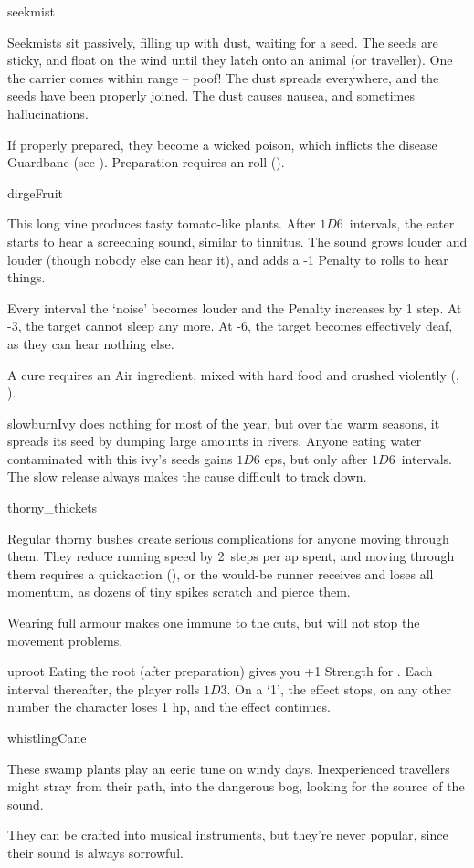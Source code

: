 \begin{multicols}{2}
%
  {seekmist}%
  {Seekmists sit passively, filling up with dust, waiting for a seed.
  The seeds are sticky, and float on the wind until they latch onto an animal (or traveller).
  One the carrier comes within range -- poof!
  The dust spreads everywhere, and the seeds have been properly joined.
  The dust causes nausea, and sometimes hallucinations.

  If properly prepared, they become a wicked poison, which inflicts the disease Guardbane (see ).
  Preparation requires an  roll (\tn[12]).
    }


%
  {dirgeFruit}%
  {This long vine produces tasty tomato-like plants.
    After $1D6$~\glspl{interval}, the eater starts to hear a screeching sound, similar to tinnitus.
    The sound grows louder and louder (though nobody else can hear it), and adds a -1 Penalty to rolls to hear things.

    Every \gls{interval} the `noise' becomes louder and the Penalty increases by 1 step.
    At -3, the target cannot sleep any more.
    At -6, the target becomes effectively deaf, as they can hear nothing else.

    A cure requires an Air \gls{ingredient}, mixed with hard food and crushed violently (, \tn[10]).}%

%
  {slowburnIvy}%
  {does nothing for most of the year, but over the warm seasons, it spreads its seed by dumping large amounts in rivers.
  Anyone eating water contaminated with this ivy's seeds gains $1D6$ \glspl{ep}, but only after $1D6$~\glspl{interval}.
  The slow release always makes the cause difficult to track down.
    }

%
  {thorny_thickets}%
  {Regular thorny bushes create serious complications for anyone moving through them.
    They reduce running speed by 2~\glspl{step} per \gls{ap} spent, and moving through them requires a  \gls{quickaction} (\tn[10]), or the would-be runner receives  and loses all momentum, as dozens of tiny spikes scratch and pierce them.

    Wearing full armour makes one immune to the cuts, but will not stop the movement problems.}%

%
  {uproot}%
  {Eating the root (after preparation) gives you +1 Strength for .
  Each \gls{interval} thereafter, the player rolls $1D3$.
  On a `1', the effect stops, on any other number the character loses 1 \gls{hp}, and the effect continues.}

%
  {whistlingCane}%
  {These swamp plants play an eerie tune on windy days.
  Inexperienced travellers might stray from their path, into the dangerous bog, looking for the source of the sound.

  They can be crafted into musical instruments, but they're never popular, since their sound is always sorrowful.}

\end{multicols}

